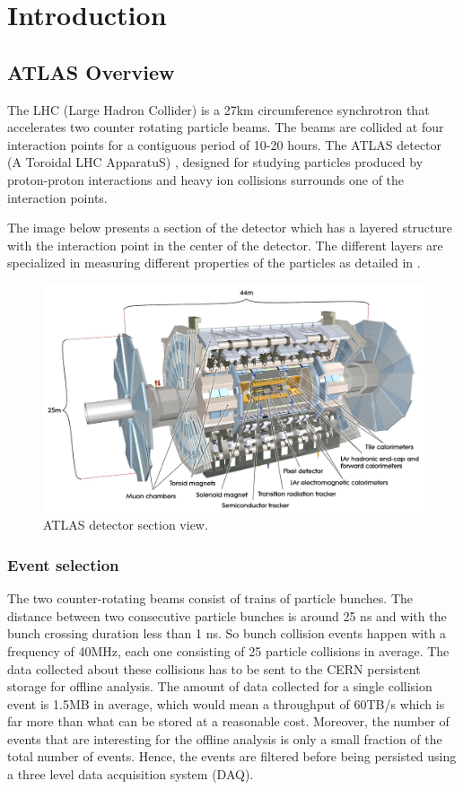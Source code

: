 \chapter{Introduction} %
\label{Capitolul1}

\section{ATLAS Overview}
The LHC (Large Hadron Collider) is a 27km circumference synchrotron that accelerates two counter rotating particle beams. The beams are collided at four interaction points for a contiguous period of 10-20 hours. The ATLAS detector (A Toroidal LHC ApparatuS) \citep{aad2008atlas}, designed for studying particles produced by proton-proton interactions and heavy ion collisions surrounds one of the interaction points. 

The image below presents a section of the detector which has a layered structure with the interaction point in the center of the detector. The different layers are specialized in measuring different properties of the particles as detailed in \citep{aad2008atlas}. 

\begin{figure}[ht!]
\centering
\includegraphics[scale=0.2]{Images/Overview.jpg}
\caption{ATLAS detector section view.}
\end{figure}


\subsection*{Event selection}
The two counter-rotating beams consist of trains of particle bunches. The distance between two consecutive particle bunches is around 25 ns and with the bunch crossing duration less than 1 ns. So bunch collision events happen with a frequency of 40MHz, each one consisting of 25 particle collisions in average. The data collected about these collisions has to be sent to the CERN persistent storage \citep{baud2003castor} for offline analysis. The amount of data collected for a single collision event is 1.5MB in average, which would mean a throughput of 60TB/s which is far more than what can be stored at a reasonable cost. Moreover, the number of events that are interesting for the offline analysis is only a small fraction of the total number of events. Hence, the events are filtered before being persisted using a three level data acquisition system (DAQ). 

